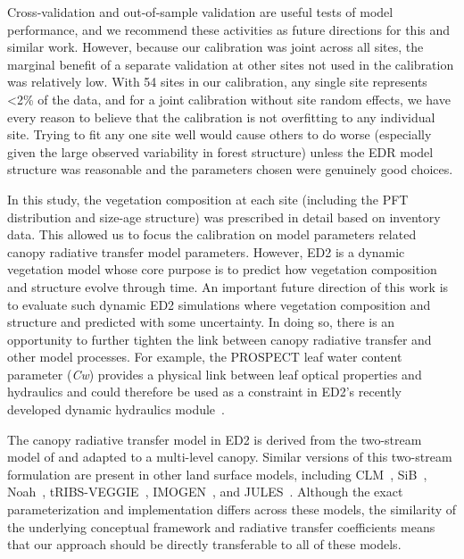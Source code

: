 Cross-validation and out-of-sample validation are useful tests of model performance, and we recommend these activities as future directions for this and similar work.
However, because our calibration was joint across all sites, the marginal benefit of a separate validation at other sites not used in the calibration was relatively low.
With 54 sites in our calibration, any single site represents <2\% of the data, and for a joint calibration without site random effects, we have every reason to believe that the calibration is not overfitting to any individual site.
Trying to fit any one site well would cause others to do worse (especially given the large observed variability in forest structure) unless the EDR model structure was reasonable and the parameters chosen were genuinely good choices.

In this study, the vegetation composition at each site (including the PFT distribution and size-age structure) was prescribed in detail based on inventory data.
This allowed us to focus the calibration on model parameters related canopy radiative transfer model parameters.
However, ED2 is a dynamic vegetation model whose core purpose is to predict how vegetation composition and structure evolve through time.
An important future direction of this work is to evaluate such dynamic ED2 simulations where vegetation composition and structure and predicted with some uncertainty.
In doing so, there is an opportunity to further tighten the link between canopy radiative transfer and other model processes.
For example, the PROSPECT leaf water content parameter (\emph{Cw}) provides a physical link between leaf optical properties and hydraulics and could therefore be used as a constraint in ED2's recently developed dynamic hydraulics module~\citep{xu2021leaf}.

The canopy radiative transfer model in ED2 is derived from the two-stream model of \citet{sellers1985canopy} and adapted to a multi-level canopy.
Similar versions of this two-stream formulation are present in other land surface models, including CLM~\citep{clm45_note}, SiB~\citep{baker2008seasonal}, Noah~\citep{niu2011community}, tRIBS-VEGGIE~\citep{ivanov2008vegetationhydrology}, IMOGEN~\citep{huntingford2008quantifying}, and JULES~\citep{best_2011_joint}.
Although the exact parameterization and implementation differs across these models, the similarity of the underlying conceptual framework and radiative transfer coefficients means that our approach should be directly transferable to all of these models.

